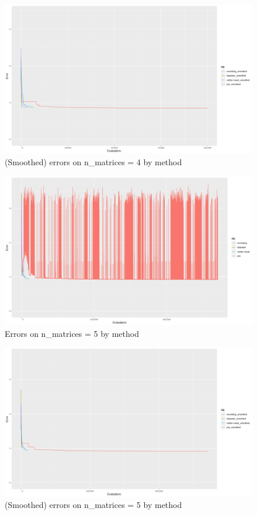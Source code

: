 \begin{figure}[!htb]
\centering
\includegraphics[width=\textwidth]{figures/n_4_smoothed}
\decoRule
\caption[n=4 (smoothed)]{(Smoothed) errors on n\_matrices = 4 by method}
\label{fig:n_4_smoothed}
\end{figure}

\begin{figure}[!htb]
\centering
\includegraphics[width=\textwidth]{figures/n_5}
\decoRule
\caption[n=5]{Errors on n\_matrices = 5 by method}
\label{fig:n_5}
\end{figure}

\begin{figure}[!htb]
\centering
\includegraphics[width=\textwidth]{figures/n_5_smoothed}
\decoRule
\caption[n=5 (smoothed)]{(Smoothed) errors on n\_matrices = 5 by method}
\label{fig:n_5_smoothed}
\end{figure}

